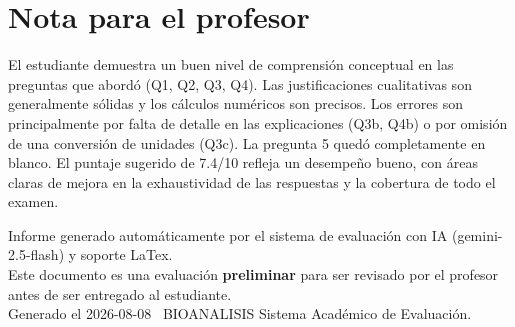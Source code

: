 \documentclass[11pt,a4paper]{article}
\begin{document}
\section*{Nota para el profesor}
\begin{tcolorbox}[
  enhanced, breakable,
  colback=yellow!8, colframe=yellow!60!black,
  fonttitle=\bfseries, coltitle=black,
  title={Observaciones para revisión manual},
  top=4pt, bottom=4pt, left=8pt, right=8pt,
]
El estudiante demuestra un buen nivel de comprensión conceptual en las preguntas que abordó (Q1, Q2, Q3, Q4). Las justificaciones cualitativas son generalmente sólidas y los cálculos numéricos son precisos. Los errores son principalmente por falta de detalle en las explicaciones (Q3b, Q4b) o por omisión de una conversión de unidades (Q3c). La pregunta 5 quedó completamente en blanco. El puntaje sugerido de 7.4/10 refleja un desempeño bueno, con áreas claras de mejora en la exhaustividad de las respuestas y la cobertura de todo el examen.
\end{tcolorbox}

\vspace{12pt}
\begin{center}
  \footnotesize\color{gray}
  Informe generado automáticamente por el sistema de evaluación con IA (gemini-2.5-flash) y soporte LaTex. \\
  Este documento es una evaluación \textbf{preliminar} para ser revisado por el profesor antes de ser entregado al 
  estudiante. \\
  Generado el 2026-08-08 \textbullet\ BIOANALISIS Sistema Académico de Evaluación.
  \end{center}
\end{document}
